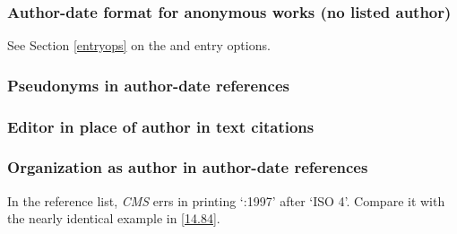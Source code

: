 \documentclass[11pt,letterpaper,oneside]{article}
\begin{document}
\setcounter{subsubsection}{33}
\subsubsection{Author-date format for anonymous works (no listed author)}

See Section \ref{entryops} on the  and 
entry options.

\begin{citeref}
\item \parencite{anon1610}
\item \parencite{anon1547}
\item \parencite{horsley1796}
\item \parencite{hawkes1834}
\end{citeref}

\subsubsection{Pseudonyms in author-date references}

\begin{citeref}
\item \parencite{stendhal1925}
\end{citeref}

\subsubsection{Editor in place of author in text citations}

\begin{citeref}
\item \parencite{silverstein1974}
\item \parencite{soltes1999}
\end{citeref}

\subsubsection{Organization as author in author-date references}

In the reference list, \textit{CMS} errs in printing `:1997' after
`ISO 4'. Compare it with the nearly identical example in \ref{14.84}.

\begin{citeref}
\item \parencite{iso1997.ref}
\end{citeref}
\end{document}

